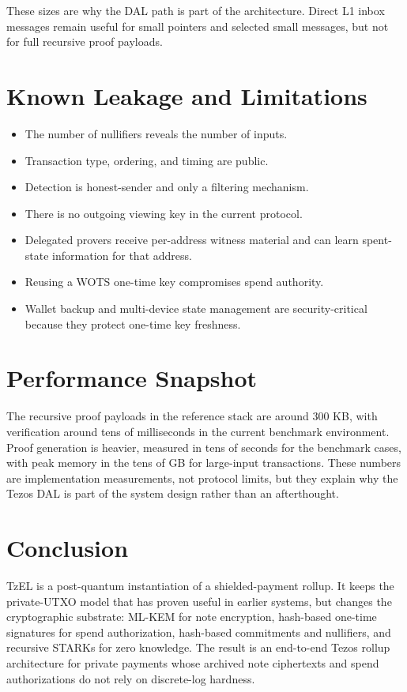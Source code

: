 \documentclass[11pt]{article}
\newcommand{\TzEL}{TzEL}
\begin{document}
These sizes are why the DAL path is part of the architecture. Direct L1 inbox
messages remain useful for small pointers and selected small messages, but not
for full recursive proof payloads.

\section{Known Leakage and Limitations}

\begin{itemize}
  \item The number of nullifiers reveals the number of inputs.
  \item Transaction type, ordering, and timing are public.
  \item Detection is honest-sender and only a filtering mechanism.
  \item There is no outgoing viewing key in the current protocol.
  \item Delegated provers receive per-address witness material and can learn
        spent-state information for that address.
  \item Reusing a WOTS one-time key compromises spend authority.
  \item Wallet backup and multi-device state management are security-critical
        because they protect one-time key freshness.
\end{itemize}

\section{Performance Snapshot}

The recursive proof payloads in the reference stack are around 300 KB, with
verification around tens of milliseconds in the current benchmark environment.
Proof generation is heavier, measured in tens of seconds for the benchmark
cases, with peak memory in the tens of GB for large-input transactions. These
numbers are implementation measurements, not protocol limits, but they explain
why the Tezos DAL is part of the system design rather than an afterthought.

\section{Conclusion}

\TzEL{} is a post-quantum instantiation of a shielded-payment rollup.
It keeps the private-UTXO model that has proven useful in earlier systems, but
changes the cryptographic substrate: ML-KEM for note encryption, hash-based
one-time signatures for spend authorization, hash-based commitments and
nullifiers, and recursive STARKs for zero knowledge. The result is an
end-to-end Tezos rollup architecture for private payments whose archived note
ciphertexts and spend authorizations do not rely on discrete-log hardness.
\end{document}
